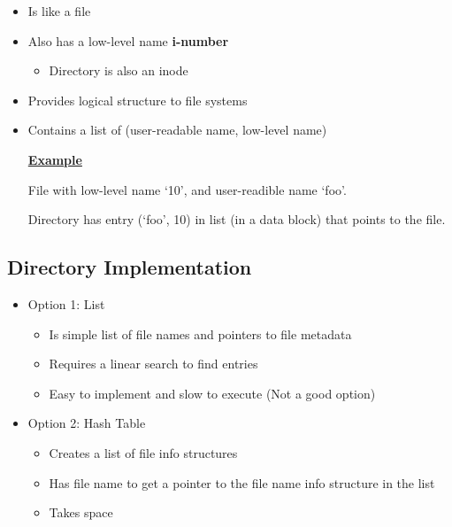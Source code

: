 \documentclass[12pt]{article}
\begin{document}
\begin{itemize}
    \item Is like a file
    \item Also has a low-level name \textbf{i-number}
    \begin{itemize}
        \item Directory is also an inode
    \end{itemize}
    \item Provides logical structure to file systems
    \item Contains a list of (user-readable name, low-level name)

    \bigskip

    \underline{\textbf{Example}}

    \bigskip

    File with low-level name `10', and user-readible name `foo'.

    \bigskip

    Directory has entry (`foo', 10) in list (in a data block) that points to the file.
\end{itemize}

\subsection{Directory Implementation}
\begin{itemize}
    \item Option 1: List
    \begin{itemize}
        \item Is simple list of file names and pointers to file metadata
        \item Requires a linear search to find entries
        \item Easy to implement and slow to execute (Not a good option)
    \end{itemize}
    \item Option 2: Hash Table
    \begin{itemize}
        \item Creates a list of file info structures
        \item Has file name to get a pointer to the file name info structure in the list
        \item Takes space
    \end{itemize}
\end{itemize}
\end{document}
